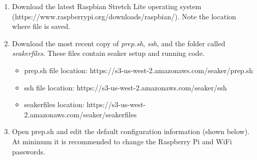 \documentclass[12pt]{article}
\begin{document}
\begin{enumerate}
  \item Download the latest Raspbian Stretch Lite operating system\\
  (https://www.raspberrypi.org/downloads/raspbian/).
  Note the location where file is saved.
  \item Download the most recent copy of {\em prep.sh}, {\em ssh}, and the 
  folder called {\em seakerfiles}. These files
  contain \gls{seaker} setup and running code.
    \begin{itemize}
      \item prep.sh file location: https://s3-us-west-2.amazonaws.com/seaker/prep.sh
      \item ssh file location: https://s3-us-west-2.amazonaws.com/seaker/ssh
      \item seakerfiles location: https://s3-us-west-2.amazonaws.com/seaker/seakerfiles
    \end{itemize}
  \item Open prep.sh and edit the default configuration information
  (shown below). At minimum it is recommended to change the Raspberry
  Pi and WiFi passwords.

  


\end{enumerate}
\end{document}
